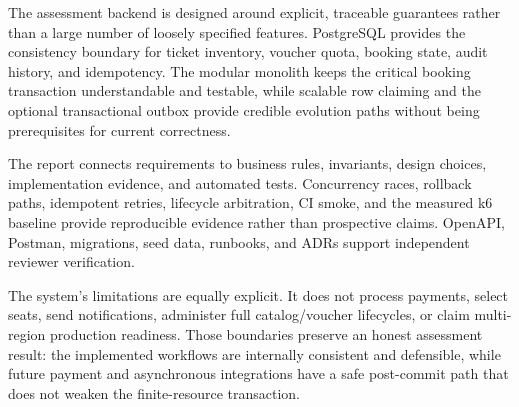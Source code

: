 The assessment backend is designed around explicit, traceable guarantees rather than a large number of loosely specified features. PostgreSQL provides the consistency boundary for ticket inventory, voucher quota, booking state, audit history, and idempotency. The modular monolith keeps the critical booking transaction understandable and testable, while scalable row claiming and the optional transactional outbox provide credible evolution paths without being prerequisites for current correctness.

The report connects requirements to business rules, invariants, design choices, implementation evidence, and automated tests. Concurrency races, rollback paths, idempotent retries, lifecycle arbitration, CI smoke, and the measured k6 baseline provide reproducible evidence rather than prospective claims. OpenAPI, Postman, migrations, seed data, runbooks, and ADRs support independent reviewer verification.

The system's limitations are equally explicit. It does not process payments,
select seats, send notifications, administer full catalog/voucher lifecycles,
or claim multi-region production readiness. Those boundaries preserve an honest
assessment result: the implemented workflows are internally consistent and
defensible, while future payment and asynchronous integrations have a safe
post-commit path that does not weaken the finite-resource transaction.

